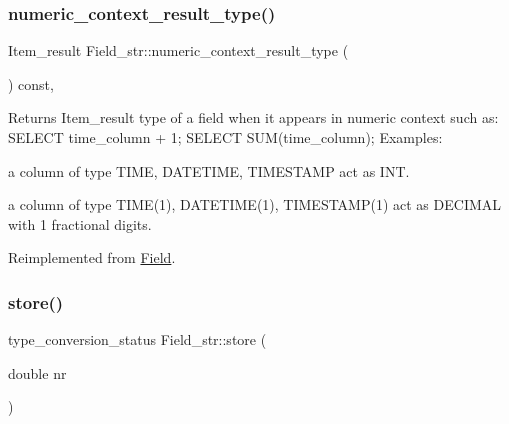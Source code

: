 \mbox{\label{classField__str_a36c5d42ff9dc8b0144a21dad03991ea7}} 
\subsubsection{\texorpdfstring{numeric\+\_\+context\+\_\+result\+\_\+type()}{numeric\_context\_result\_type()}}
{\footnotesize\ttfamily Item\+\_\+result Field\+\_\+str\+::numeric\+\_\+context\+\_\+result\+\_\+type (\begin{DoxyParamCaption}{ }\end{DoxyParamCaption}) const\hspace{0.3cm}{\ttfamily [inline]}, {\ttfamily [virtual]}}

Returns Item\+\_\+result type of a field when it appears in numeric context such as\+: S\+E\+L\+E\+CT time\+\_\+column + 1; S\+E\+L\+E\+CT S\+U\+M(time\+\_\+column); Examples\+:
\begin{DoxyItemize}
\item a column of type T\+I\+ME, D\+A\+T\+E\+T\+I\+ME, T\+I\+M\+E\+S\+T\+A\+MP act as I\+NT.
\item a column of type T\+I\+M\+E(1), D\+A\+T\+E\+T\+I\+M\+E(1), T\+I\+M\+E\+S\+T\+A\+M\+P(1) act as D\+E\+C\+I\+M\+AL with 1 fractional digits. 
\end{DoxyItemize}

Reimplemented from \mbox{\hyperlink{classField_a834475c74f6d0812dc4aa1abfc483a7f}{Field}}.

\mbox{\label{classField__str_ad4b48698ff57cae15a2df92f1145b102}} 
\subsubsection{\texorpdfstring{store()}{store()}}
{\footnotesize\ttfamily type\+\_\+conversion\+\_\+status Field\+\_\+str\+::store (\begin{DoxyParamCaption}\item[{double}]{nr }\end{DoxyParamCaption})\hspace{0.3cm}{\ttfamily [virtual]}}


